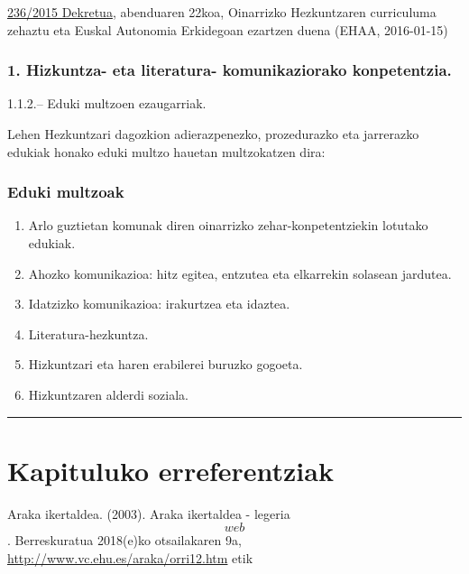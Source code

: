 \documentclass[
]{book}
\providecommand{\tightlist}{%
  \setlength{\itemsep}{0pt}\setlength{\parskip}{0pt}}
\begin{document}
\href{http://www.jusap.ejgv.euskadi.eus/r47-bopvapps/es/bopv2/datos/2016/01/1600141e.pdf}{236/2015 Dekretua}, abenduaren 22koa, Oinarrizko Hezkuntzaren curriculuma zehaztu eta Euskal Autonomia Erkidegoan ezartzen duena (EHAA, 2016-01-15)

\hypertarget{hizkuntza--eta-literatura--komunikaziorako-konpetentzia.}{%
\subsubsection{1. Hizkuntza- eta literatura- komunikaziorako konpetentzia.}\label{hizkuntza--eta-literatura--komunikaziorako-konpetentzia.}}

1.1.2.-- Eduki multzoen ezaugarriak.

Lehen Hezkuntzari dagozkion adierazpenezko, prozedurazko eta jarrerazko edukiak honako eduki multzo hauetan multzokatzen dira:

\hypertarget{eduki-multzoak}{%
\subsubsection{Eduki multzoak}\label{eduki-multzoak}}

\begin{enumerate}
\def\labelenumi{\arabic{enumi}.}
\tightlist
\item
  Arlo guztietan komunak diren oinarrizko zehar-konpetentziekin lotutako edukiak.
\item
  Ahozko komunikazioa: hitz egitea, entzutea eta elkarrekin solasean jardutea.
\item
  Idatzizko komunikazioa: irakurtzea eta idaztea.
\item
  Literatura-hezkuntza.
\item
  Hizkuntzari eta haren erabilerei buruzko gogoeta.
\item
  Hizkuntzaren alderdi soziala.
\end{enumerate}

\begin{center}\rule{0.5\linewidth}{0.5pt}\end{center}

\hypertarget{kapituluko-erreferentziak}{%
\section{Kapituluko erreferentziak}\label{kapituluko-erreferentziak}}

Araka ikertaldea. (2003). Araka ikertaldea - legeria \[web\]. Berreskuratua 2018(e)ko otsailakaren 9a, \url{http://www.vc.ehu.es/araka/orri12.htm} etik
\end{document}
